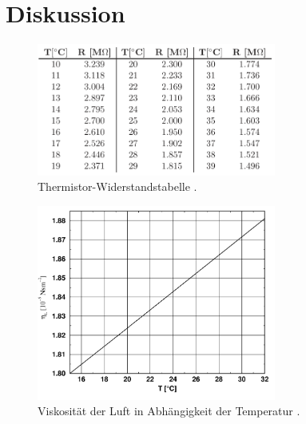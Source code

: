 \section{Diskussion}
\label{sec:Diskussion}

\label{sec:Anhang}

\begin{figure}
    \centering
    \includegraphics[width=0.7\textwidth]{bilder/thermistorwiderstand.png}
    \caption{Thermistor-Widerstandstabelle \cite{sample}.}
    \label{fig:thermistor}
\end{figure}

\begin{figure}
    \centering
    \includegraphics[width=0.7\textwidth]{bilder/viskositaet.png}
    \caption{Viskosität der Luft in Abhängigkeit der Temperatur \cite{sample}.}
    \label{fig:viskositaet}
\end{figure}

